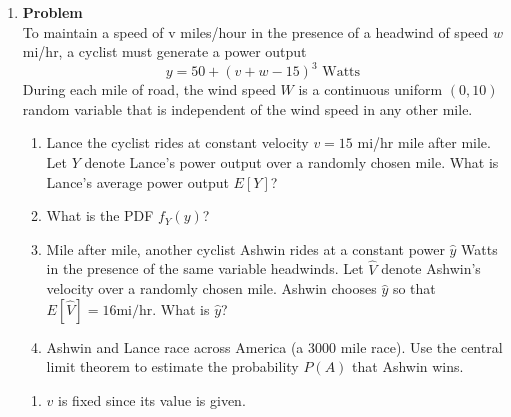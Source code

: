 \documentclass[12pt]{article}
\newenvironment{Ex}{\textbf{Problem}\vspace{.75em}\\}{}
\begin{document}
\begin{enumerate}
\begin{Ex}
\begin{solution}
\begin{enumerate}
\begin{equation}
\begin{aligned}
          \end{aligned}
        \end{equation}
        Where $\delta$ is the deviation from the mean. So the upper
        bound on the number of people which can be seated with
        confidence 0.9 is
        \begin{equation}
          \label{eq:3a-sol}
          \implies (\mu+\delta)n = 315.696
        \end{equation}
      \end{enumerate}
    \end{solution}
  \end{Ex}

\item
  \begin{Ex}
    To maintain a speed of v miles/hour in the presence of a headwind
    of speed $w$ mi/hr, a cyclist must generate a power output
    \begin{equation}
      \label{eq:4-power}
      y = 50 + (v + w - 15)^3 \text{ Watts}
    \end{equation}
    During each mile of road, the wind speed
    $W$ is a continuous uniform $(0,10)$ random variable that is
    independent of the wind speed in any other mile.
    \begin{enumerate}
    \item Lance the cyclist rides at constant velocity $v = 15$ mi/hr
      mile after mile. Let $Y$ denote Lance's power output over a
      randomly chosen mile. What is Lance's average power output
      $E[Y]$?
    \item What is the PDF $f_Y (y)$?
    \item Mile after mile, another cyclist Ashwin rides at a constant
      power $\hat{y}$ Watts in the presence of the same variable
      headwinds. Let $\hat{V}$ denote Ashwin's velocity over a
      randomly chosen mile. Ashwin chooses $\hat{y}$ so that
      $E[\hat{V}] = 16 \text{mi/hr}$. What is $\hat{y}$?
    \item Ashwin and Lance race across America (a 3000 mile race). Use
      the central limit theorem to estimate the probability $P(A)$
      that Ashwin wins.
    \end{enumerate}
    \begin{solution} \hfill
      \begin{enumerate}
      \item $v$ is fixed since its value is given.
        \begin{equation}
          \label{eq:4a-presol}

\end{equation}
\end{enumerate}
\end{solution}
\end{Ex}
\end{enumerate}
\end{document}
